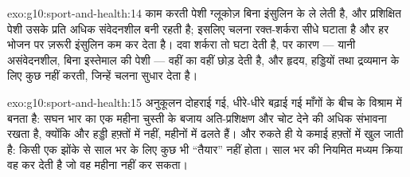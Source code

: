 \begin{solution}{exo:g10:sport-and-health:14}
काम करती पेशी ग्लूकोज़ बिना इंसुलिन के ले लेती है, और प्रशिक्षित पेशी उसके
प्रति अधिक संवेदनशील बनी रहती है; इसलिए चलना रक्त-शर्करा सीधे घटाता है और
हर भोजन पर ज़रूरी इंसुलिन कम कर देता है। दवा शर्करा तो घटा देती है, पर
कारण --- यानी असंवेदनशील, बिना इस्तेमाल की पेशी --- वहीं का वहीं छोड़
देती है, और हृदय, हड्डियों तथा द्रव्यमान के लिए कुछ नहीं करती, जिन्हें
चलना सुधार देता है।
\end{solution}

\begin{solution}{exo:g10:sport-and-health:15}
अनुकूलन दोहराई गई, धीरे-धीरे बढ़ाई गई माँगों के बीच के विश्राम में बनता
है: सघन भार का एक महीना चुस्ती के बजाय अति-प्रशिक्षण और चोट देने की अधिक
संभावना रखता है, क्योंकि  और हड्डी हफ़्तों में नहीं, महीनों में ढलते
हैं। और रुकते ही ये कमाई हफ़्तों में खुल जाती है: किसी एक झोंके से साल भर
के लिए कुछ भी ``तैयार'' नहीं होता। साल भर की नियमित मध्यम क्रिया वह कर
देती है जो वह महीना नहीं कर सकता।
\end{solution}

